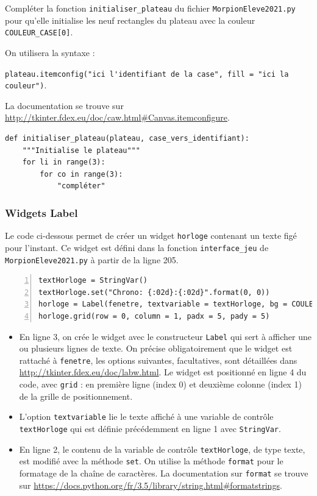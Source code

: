 \documentclass[a4paper, french, 12pt]{article}  %
\newcounter{exo}
\newcounter{exoB}
\newenvironment{exerciceB2}
{\par \bigskip  \noindent \addtocounter{exoB}{1} \hrulefill \quad { \large \textbf{Exercice \theexoB}} \quad \hrulefill \par \medskip }
{\par \bigskip }
\newcounter{act}
\newcounter{def}
\begin{document}
\begin{exerciceB2}{}
Compléter la fonction \lstinline+initialiser_plateau+ du fichier \texttt{MorpionEleve2021.py} pour qu'elle initialise 
les neuf rectangles du plateau avec la couleur \lstinline+COULEUR_CASE[0]+. 

On utilisera  la syntaxe :

\lstinline+plateau.itemconfig("ici l'identifiant de la case", fill = "ici la couleur")+.


La documentation se trouve sur \url{http://tkinter.fdex.eu/doc/caw.html#Canvas.itemconfigure}. 

\begin{lstlisting}
def initialiser_plateau(plateau, case_vers_identifiant):
    """Initialise le plateau"""
    for li in range(3):
        for co in range(3):
            "compléter"
\end{lstlisting}

\end{exerciceB2}


\subsubsection{Widgets Label}

Le code ci-dessous permet de créer un widget \lstinline+horloge+ contenant un texte figé pour l'instant. Ce widget est défini dans la fonction \lstinline+interface_jeu+ de \texttt{MorpionEleve2021.py} à partir de la ligne 205.

\begin{lstlisting}[numbers=left]
textHorloge = StringVar()  
textHorloge.set("Chrono: {:02d}:{:02d}".format(0, 0))
horloge = Label(fenetre, textvariable = textHorloge, bg = COULEUR_BOUTON, relief = 'raised')
horloge.grid(row = 0, column = 1, padx = 5, pady = 5)
\end{lstlisting}

\begin{itemize}[label=]
	\item En ligne 3, on crée le widget avec le constructeur \lstinline+Label+ qui sert à afficher une ou plusieurs lignes de texte. On précise obligatoirement que le widget est rattaché à \lstinline+fenetre+, les options suivantes, facultatives, sont  détaillées dans \url{http://tkinter.fdex.eu/doc/labw.html}. Le widget est positionné en ligne 4 du code, avec \lstinline+grid+ : en première ligne (index 0) et deuxième colonne (index 1) de la grille de positionnement.
	\item L'option \lstinline+textvariable+ lie le texte affiché à une variable de contrôle \lstinline+textHorloge+ qui est définie précédemment en ligne 1 avec \lstinline+StringVar+. 
	 \item En ligne 2, le contenu de la  variable de contrôle \lstinline+textHorloge+, de type texte, est modifié avec la méthode \lstinline+set+. On utilise la méthode \lstinline+format+ pour le formatage de la chaîne de caractères. La documentation sur \lstinline+format+ se trouve sur \url{https://docs.python.org/fr/3.5/library/string.html#formatstrings}.
\end{itemize}
\end{document}
